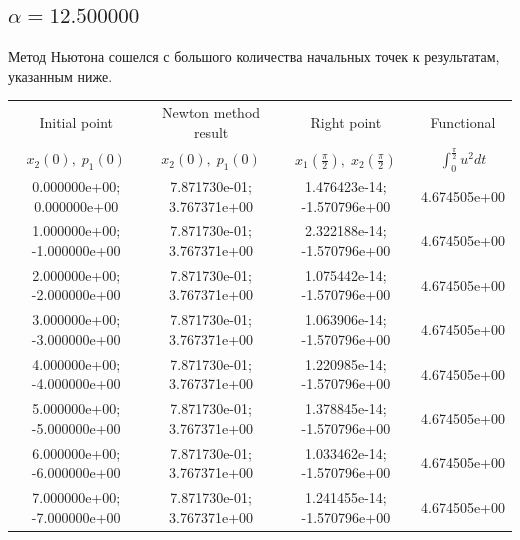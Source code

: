 \documentclass[titlepage]{article}
\def\l{\left}
\def\r{\right}
\begin{document}
\subsection{$\alpha = 12.500000$} 
Метод Ньютона сошелся с большого количества начальных точек к результатам, указанным ниже. \\ 
\begin{tabular}{ | c | c | c | c |} 
\hline 
Initial point  & Newton method result & Right point & Functional 
 \\ $x_2(0), \; p_1(0)$ & $x_2(0), \; p_1(0)$ & $x_1\l(\frac{\pi}{2}\r), \; x_2\l(\frac{\pi}{2}\r)$ & $\int_{0}^{\frac{\pi}{2}}u^2dt$  \\ \hline 
0.000000e+00; 0.000000e+00 & 7.871730e-01; 3.767371e+00 & 1.476423e-14; -1.570796e+00 & 4.674505e+00 \\ \hline 
1.000000e+00; -1.000000e+00 & 7.871730e-01; 3.767371e+00 & 2.322188e-14; -1.570796e+00 & 4.674505e+00 \\ \hline 
2.000000e+00; -2.000000e+00 & 7.871730e-01; 3.767371e+00 & 1.075442e-14; -1.570796e+00 & 4.674505e+00 \\ \hline 
3.000000e+00; -3.000000e+00 & 7.871730e-01; 3.767371e+00 & 1.063906e-14; -1.570796e+00 & 4.674505e+00 \\ \hline 
4.000000e+00; -4.000000e+00 & 7.871730e-01; 3.767371e+00 & 1.220985e-14; -1.570796e+00 & 4.674505e+00 \\ \hline 
5.000000e+00; -5.000000e+00 & 7.871730e-01; 3.767371e+00 & 1.378845e-14; -1.570796e+00 & 4.674505e+00 \\ \hline 
6.000000e+00; -6.000000e+00 & 7.871730e-01; 3.767371e+00 & 1.033462e-14; -1.570796e+00 & 4.674505e+00 \\ \hline 
7.000000e+00; -7.000000e+00 & 7.871730e-01; 3.767371e+00 & 1.241455e-14; -1.570796e+00 & 4.674505e+00 \\ \hline 
\end{tabular} 
\end{document}
